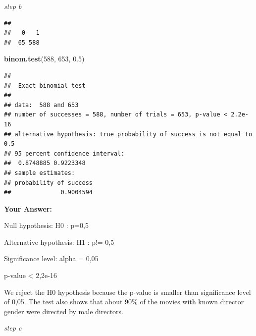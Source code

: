 \documentclass[
]{article}
\newenvironment{Shaded}{\begin{snugshade}}{\end{snugshade}}
\newcommand{\CommentTok}[1]{\textcolor[rgb]{0.56,0.35,0.01}{\textit{#1}}}
\newcommand{\ConstantTok}[1]{\textcolor[rgb]{0.56,0.35,0.01}{#1}}
\newcommand{\DecValTok}[1]{\textcolor[rgb]{0.00,0.00,0.81}{#1}}
\newcommand{\FloatTok}[1]{\textcolor[rgb]{0.00,0.00,0.81}{#1}}
\newcommand{\FunctionTok}[1]{\textcolor[rgb]{0.13,0.29,0.53}{\textbf{#1}}}
\newcommand{\NormalTok}[1]{#1}
\newcommand{\OtherTok}[1]{\textcolor[rgb]{0.56,0.35,0.01}{#1}}
\newcommand{\SpecialCharTok}[1]{\textcolor[rgb]{0.81,0.36,0.00}{\textbf{#1}}}
\newcommand{\StringTok}[1]{\textcolor[rgb]{0.31,0.60,0.02}{#1}}
\begin{document}
\emph{step b}

\begin{Shaded}
\end{Shaded}

\begin{verbatim}
## 
##   0   1 
##  65 588
\end{verbatim}

\begin{Shaded}
\begin{Highlighting}[]
\FunctionTok{binom.test}\NormalTok{(}\DecValTok{588}\NormalTok{, }\DecValTok{653}\NormalTok{, }\FloatTok{0.5}\NormalTok{)}
\end{Highlighting}
\end{Shaded}

\begin{verbatim}
## 
##  Exact binomial test
## 
## data:  588 and 653
## number of successes = 588, number of trials = 653, p-value < 2.2e-16
## alternative hypothesis: true probability of success is not equal to 0.5
## 95 percent confidence interval:
##  0.8748885 0.9223348
## sample estimates:
## probability of success 
##              0.9004594
\end{verbatim}

\textbf{Your Answer:}

Null hypothesis: H0 : p=0,5

Alternative hypothesis: H1 : p!= 0,5

Significance level: alpha = 0,05

p-value \textless{} 2,2e-16

We reject the H0 hypothesis because the p-value is smaller than
significance level of 0,05. The test also shows that about 90\% of the
movies with known director gender were directed by male directors.

\emph{step c}
\end{document}
